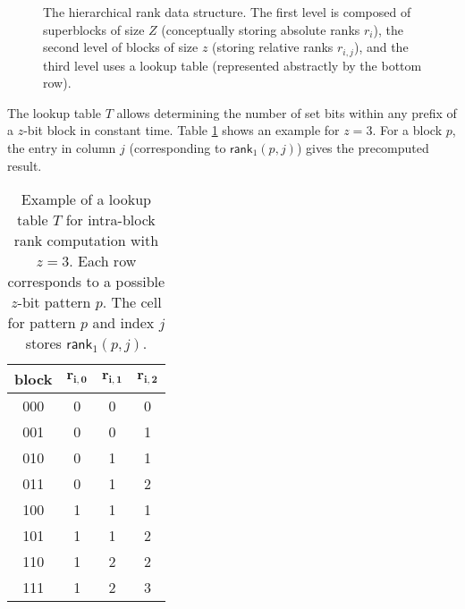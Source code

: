 \begin{figure}[hbtp]
\begin{flushright}
    \end{flushright}
    \caption{The hierarchical \textsf{rank} data structure. The first level is composed of superblocks of size $Z$ (conceptually storing absolute ranks $r_i$), the second level of blocks of size $z$ (storing relative ranks $r_{i,j}$), and the third level uses a lookup table (represented abstractly by the bottom row).} \label{fig:RRR}
\end{figure}


The lookup table $T$ allows determining the number of set bits within any prefix of a $z$-bit block in constant time. Table \ref{tab:lookup} shows an example for $z=3$. For a block $p$, the entry in column $j$ (corresponding to $\textsf{rank}_1(p, j)$) gives the precomputed result.

\begin{table}[h]
    \centering
    \begin{tabular}{|c|c|c|c|}
        \hline
        \textbf{block} & $\mathbf{r_{i,0}}$ & $\mathbf{r_{i,1}}$ & $\mathbf{r_{i,2}}$ \\
        \hline
        000            & 0                  & 0                  & 0                  \\
        001            & 0                  & 0                  & 1                  \\
        010            & 0                  & 1                  & 1                  \\
        011            & 0                  & 1                  & 2                  \\
        100            & 1                  & 1                  & 1                  \\
        101            & 1                  & 1                  & 2                  \\
        110            & 1                  & 2                  & 2                  \\
        111            & 1                  & 2                  & 3                  \\
        \hline
    \end{tabular}
    \caption{Example of a lookup table $T$ for intra-block rank computation with $z = 3$. Each row corresponds to a possible $z$-bit pattern $p$. The cell for pattern $p$ and index $j$ stores $\textsf{rank}_1(p, j)$.} \label{tab:lookup}
\end{table}

